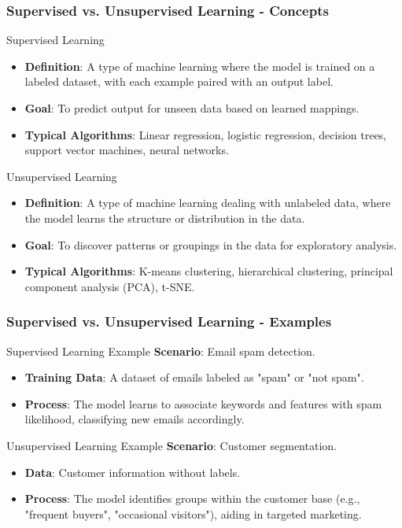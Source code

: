 \documentclass[aspectratio=169]{beamer}
\begin{document}
\begin{frame}[fragile]
  \frametitle{Supervised vs. Unsupervised Learning - Concepts}
  \begin{block}{Supervised Learning}
    \begin{itemize}
      \item \textbf{Definition}: A type of machine learning where the model is trained on a labeled dataset, with each example paired with an output label.
      \item \textbf{Goal}: To predict output for unseen data based on learned mappings.
      \item \textbf{Typical Algorithms}: Linear regression, logistic regression, decision trees, support vector machines, neural networks.
    \end{itemize}
  \end{block}

  \begin{block}{Unsupervised Learning}
    \begin{itemize}
      \item \textbf{Definition}: A type of machine learning dealing with unlabeled data, where the model learns the structure or distribution in the data.
      \item \textbf{Goal}: To discover patterns or groupings in the data for exploratory analysis.
      \item \textbf{Typical Algorithms}: K-means clustering, hierarchical clustering, principal component analysis (PCA), t-SNE.
    \end{itemize}
  \end{block}
\end{frame}

\begin{frame}[fragile]
  \frametitle{Supervised vs. Unsupervised Learning - Examples}
  \begin{block}{Supervised Learning Example}
    \textbf{Scenario}: Email spam detection.
    \begin{itemize}
      \item \textbf{Training Data}: A dataset of emails labeled as "spam" or "not spam".
      \item \textbf{Process}: The model learns to associate keywords and features with spam likelihood, classifying new emails accordingly.
    \end{itemize}
  \end{block}

  \begin{block}{Unsupervised Learning Example}
    \textbf{Scenario}: Customer segmentation.
    \begin{itemize}
      \item \textbf{Data}: Customer information without labels.
      \item \textbf{Process}: The model identifies groups within the customer base (e.g., "frequent buyers", "occasional visitors"), aiding in targeted marketing.
    \end{itemize}
  \end{block}
\end{frame}
\end{document}
